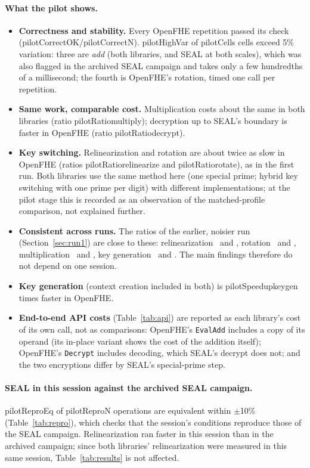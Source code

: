 \documentclass[11pt]{article}
\providecommand{\run}{pilot}
\newcommand{\R}[1]{\csname\run#1\endcsname}
\begin{document}
\paragraph{What the pilot shows.}
\begin{itemize}[leftmargin=*, itemsep=2pt]
  \item \textbf{Correctness and stability.} Every OpenFHE repetition passed its check (\R{CorrectOK}/\R{CorrectN}). \R{HighVar} of \R{Cells} cells exceed 5\% variation: three are \emph{add} (both libraries, and SEAL at both scales), which was also flagged in the archived SEAL campaign and takes only a few hundredths of a millisecond; the fourth is OpenFHE's rotation, timed one call per repetition.
  \item \textbf{Same work, comparable cost.} Multiplication costs about the same in both libraries (ratio \R{Ratiomultiply}); decryption up to SEAL's boundary is faster in OpenFHE (ratio \R{Ratiodecrypt}).
  \item \textbf{Key switching.} Relinearization and rotation are about twice as slow in OpenFHE (ratios \R{Ratiorelinearize} and \R{Ratiorotate}), as in the first run. Both libraries use the same method here (one special prime; hybrid key switching with one prime per digit) with different implementations; at the pilot stage this is recorded as an observation of the matched-profile comparison, not explained further.
  \item \textbf{Consistent across runs.} The ratios of the earlier, noisier run (Section~\ref{sec:run1}) are close to these: relinearization \runoneRatiorelinearize\ and \pilotRatiorelinearize, rotation \runoneRatiorotate\ and \pilotRatiorotate, multiplication \runoneRatiomultiply\ and \pilotRatiomultiply, key generation \runoneRatiokeygen\ and \pilotRatiokeygen. The main findings therefore do not depend on one session.
  \item \textbf{Key generation} (context creation included in both) is \R{Speedupkeygen} times faster in OpenFHE.
  \item \textbf{End-to-end API costs} (Table~\ref{tab:api}) are reported as each library's cost of its own call, not as comparisons: OpenFHE's \texttt{EvalAdd} includes a copy of its operand (its in-place variant shows the cost of the addition itself); OpenFHE's \texttt{Decrypt} includes decoding, which SEAL's decrypt does not; and the two encryptions differ by SEAL's special-prime step.
\end{itemize}

\paragraph{SEAL in this session against the archived SEAL campaign.} \R{ReproEq} of \R{ReproN} operations are equivalent within $\pm$10\% (Table~\ref{tab:repro}), which checks that the session's conditions reproduce those of the SEAL campaign. Relinearization ran faster in this session than in the archived campaign; since both libraries' relinearization were measured in this same session, Table~\ref{tab:results} is not affected.
\end{document}
